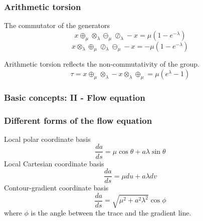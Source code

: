 \documentclass[aspectratio=169]{beamer}
\begin{document}
\begin{frame}
    \frametitle{Arithmetic torsion}
    The commutator of the generators
    \begin{equation}
        x \oplus_\mu \otimes_\lambda \ominus_\mu \oslash_\lambda - x = \mu(1 - e^{-\lambda})\label{eq:commutator1}
    \end{equation}
    \begin{equation}
        x \otimes_\lambda \oplus_\mu \oslash_\lambda \ominus_\mu - x = - \mu(1 - e^{-\lambda})\label{eq:commutator2}
    \end{equation}

    Arithmetic torsion reflects the non-commutativity of the group.
    \begin{equation}
        \tau = x \oplus_\mu \otimes_\lambda - x \otimes_\lambda \oplus_\mu = \mu(e^\lambda - 1)\label{eq:torsion}
    \end{equation}
\end{frame}

\begin{frame}
    \frametitle{Basic concepts: II - Flow equation}
    \begin{figure}[ht]\centering
    \end{figure}
\end{frame}

\begin{frame}
    \frametitle{Different forms of the flow equation}
    Local polar coordinate basis
    \begin{equation}
        \frac{da}{ds} = \mu \cos \theta + a \lambda \sin \theta\label{eq:polar-flow}
    \end{equation}
    Local Cartesian coordinate basis
    \begin{equation}
        \frac{da}{ds} = \mu du + a \lambda dv \label{eq:cartesian-flow}
    \end{equation}
    Contour-gradient coordinate basis
    \begin{equation}
        \frac{da}{ds} = \sqrt {\mu^2 + a^2 \lambda^2} \cos \phi\label{eq:contour-gradient-flow}
    \end{equation}
    where $\phi$ is the angle between the trace and the gradient line.
\end{frame}
\end{document}
